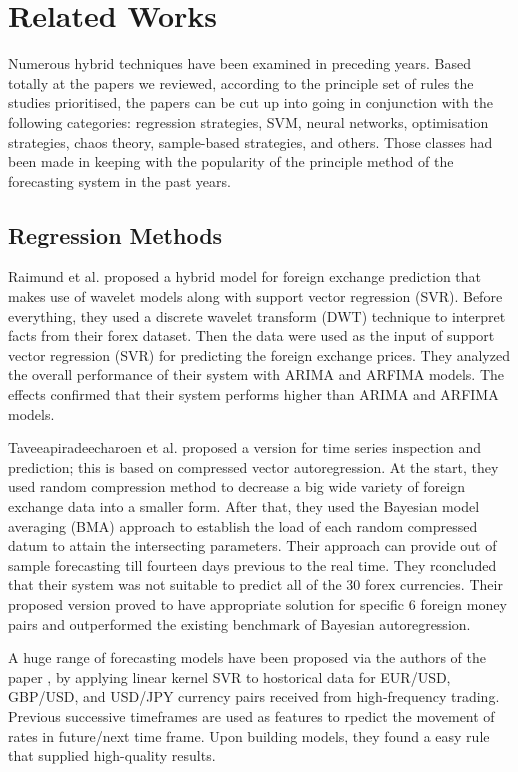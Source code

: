 \section{Related Works}

Numerous hybrid techniques have been examined in preceding years. Based totally at the papers we reviewed, according to the principle set of rules the studies prioritised, the papers can be cut up into going in conjunction with the following categories: regression strategies, SVM, neural networks, optimisation strategies, chaos theory, sample-based strategies, and others. Those classes had been made in keeping with the popularity of the principle method of the forecasting system in the past years.

\subsection{Regression Methods}

Raimund et al. \cite{Raimundo18} proposed a hybrid model for foreign exchange prediction that makes use of wavelet models along with support vector regression (SVR). Before everything, they used a discrete wavelet transform (DWT) technique to interpret facts from their forex dataset. Then the data were used as the input of support vector regression (SVR) for predicting the foreign exchange prices. They analyzed the overall performance of their system with ARIMA and ARFIMA models. The effects confirmed that their system performs higher than ARIMA and ARFIMA models. 

Taveeapiradeecharoen et al. \citep{Taveeapiradeecharoen19} proposed a version for time series inspection and prediction; this is based on compressed vector autoregression. At the start, they used random compression method to decrease a big wide variety of foreign exchange data into a smaller form. After that, they used the Bayesian model averaging (BMA) approach to establish the load of each random compressed datum to attain the intersecting parameters. Their approach can provide out of sample forecasting till fourteen days previous to the real time. They rconcluded that their system was not suitable to predict all of the 30 forex currencies. Their proposed version proved to have appropriate solution for specific 6 foreign money pairs and outperformed the existing benchmark of Bayesian autoregression. 

A huge range of forecasting models have been proposed via the authors of the paper \cite{Serjam18}, by  applying linear kernel SVR to hostorical data for EUR/USD, GBP/USD, and USD/JPY currency pairs received from high-frequency trading. Previous successive timeframes are used as features to rpedict the movement of rates in future/next time frame. Upon building models, they found a easy rule that supplied high-quality results.

